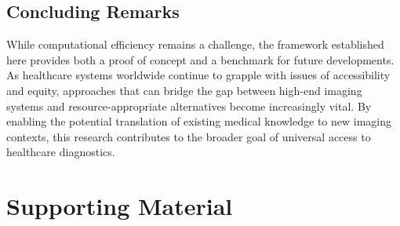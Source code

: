 \documentclass[nomenclature, english, bibtex]{kththesis}
\newcommand*{\warningExpl}[1]{\todo[inline, backgroundcolor=kth-lightred40]{#1}} %
\numberwithin{listing}{chapter}
\begin{document}
\section{Concluding Remarks}

While computational efficiency remains a challenge, the framework established here provides both a proof of concept and a benchmark for future developments. As healthcare systems worldwide continue to grapple with issues of accessibility and equity, approaches that can bridge the gap between high-end imaging systems and resource-appropriate alternatives become increasingly vital. By enabling the potential translation of existing medical knowledge to new imaging contexts, this research contributes to the broader goal of universal access to healthcare diagnostics.




\cleardoublepage
\renewcommand{\bibname}{References}


\ifbiblatex
    \printbibliography[heading=bibintoc]
\else
    
\fi



\appendix
\renewcommand{\chaptermark}[1]{\markboth{Appendix \thechapter\relax:\thinspace\relax#1}{}}
\chapter{Supporting Material}
\end{document}
